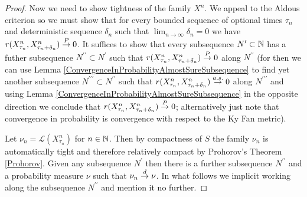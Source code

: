 \begin{proof}
Now we need to show tightness of the family $X^n$.  We appeal to the
Aldous criterion so we must show that for every bounded sequence of
optional times $\tau_n$ and deterministic sequence $\delta_n$ such
that $\lim_{n \to \infty} \delta_n = 0$ we have $r(X^n_{\tau_n},
X^n_{\tau_n + \delta_n}) \overset{P}\to 0$.  It suffices to show that every subsequence $N^\prime \subset \mathbb{N}$ has a futher
subsequence $N^{\prime \prime} \subset N^{\prime}$ such that $r(X^n_{\tau_n},X^n_{\tau_n + \delta_n}) \overset{P}\to 0$ along $N^{\prime \prime}$ (for then
we can use Lemma \ref{ConvergenceInProbabilityAlmostSureSubsequence} to find yet another subsequence $N^{\prime \prime \prime} \subset N^{\prime \prime}$ such
that $r(X^n_{\tau_n},X^n_{\tau_n + \delta_n}) \overset{a.s.}\to 0$ along $N^{\prime \prime \prime}$ and using Lemma \ref{ConvergenceInProbabilityAlmostSureSubsequence} in the
opposite direction we conclude that $r(X^n_{\tau_n},X^n_{\tau_n + \delta_n}) \overset{P}\to 0$; alternatively just note that convergence in probability is convergence with respect to the
Ky Fan metric).

Let $\nu_n = \mathcal{L}(X^n_{\tau_n})$ for $n \in \mathbb{N}$.  Then
by compactness of $S$ the family $\nu_n$ is automatically tight and therefore relatively compact by Prohorov's Theorem \ref{Prohorov}.  Given any 
subsequence $N^\prime$ then there is a further subsequence $N^{\prime \prime}$ and a probability measure $\nu$ such that $\nu_n \overset{d}\to \nu$.  In what follows we
implicit working along the subsequence $N^{\prime \prime}$ and mention it no further.


\end{proof}
